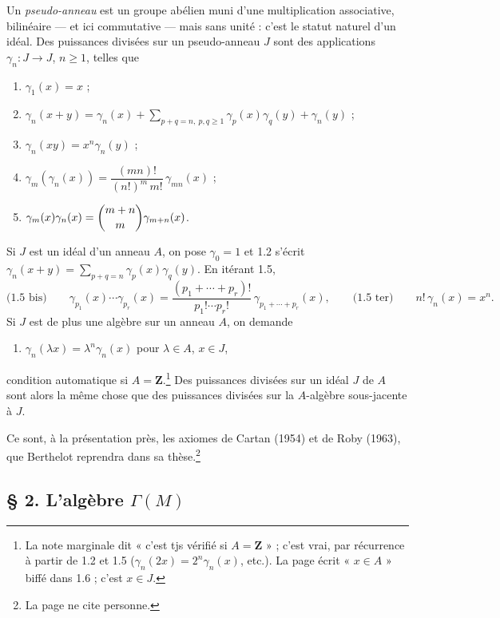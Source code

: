 \documentclass[11pt,a4paper]{article}
\begin{document}
Un \emph{pseudo-anneau} est un groupe abélien muni d'une multiplication
associative, bilinéaire — et ici commutative — mais sans unité : c'est le
statut naturel d'un idéal. Des puissances divisées sur un pseudo-anneau $J$
sont des applications $\gamma_n : J \to J$, $n \geqslant 1$, telles que
\begin{enumerate}
\item[1.1.] $\gamma_1(x) = x$ ;
\item[1.2.] $\gamma_n(x+y) = \gamma_n(x) + \sum_{p+q=n,\ p, q \geqslant 1}
\gamma_p(x)\gamma_q(y) + \gamma_n(y)$ ;
\item[1.3.] $\gamma_n(xy) = x^{n}\gamma_n(y)$ ;
\item[1.4.] $\gamma_m(\gamma_n(x)) = \dfrac{(mn)!}{(n!)^{m}\, m!}\,
\gamma_{mn}(x)$ ;
\item[1.5.] $\gamma_m(x)\gamma_n(x) = \dbinom{m+n}{m}\gamma_{m+n}(x)$.
\end{enumerate}
Si $J$ est un idéal d'un anneau $A$, on pose $\gamma_0 = 1$ et 1.2 s'écrit
$\gamma_n(x+y) = \sum_{p+q=n}\gamma_p(x)\gamma_q(y)$. En itérant 1.5,
\[
\text{(1.5 bis)} \qquad \gamma_{p_1}(x)\cdots\gamma_{p_r}(x) =
\frac{(p_1 + \cdots + p_r)!}{p_1!\cdots p_r!}\,\gamma_{p_1+\cdots+p_r}(x),
\qquad \text{(1.5 ter)} \qquad n!\,\gamma_n(x) = x^{n}.
\]
Si $J$ est de plus une algèbre sur un anneau $A$, on demande
\begin{enumerate}
\item[1.6.] $\gamma_n(\lambda x) = \lambda^{n}\gamma_n(x)$ pour $\lambda \in
A$, $x \in J$,
\end{enumerate}
condition automatique si $A = \mathbf{Z}$.\footnote{La note marginale dit
« c'est tjs vérifié si $A = \mathbf{Z}$ » ; c'est vrai, par récurrence à
partir de 1.2 et 1.5 ($\gamma_n(2x) = 2^{n}\gamma_n(x)$, etc.). La page
écrit « $x \in A$ » biffé dans 1.6 ; c'est $x \in J$.} Des puissances
divisées sur un idéal $J$ de $A$ sont alors la même chose que des puissances
divisées sur la $A$-algèbre sous-jacente à $J$.

Ce sont, à la présentation près, les axiomes de Cartan (1954) et de Roby
(1963), que Berthelot reprendra dans sa thèse.\footnote{La page ne cite
personne.}

\subsection*{§ 2. L'algèbre $\Gamma(M)$}
\end{document}
